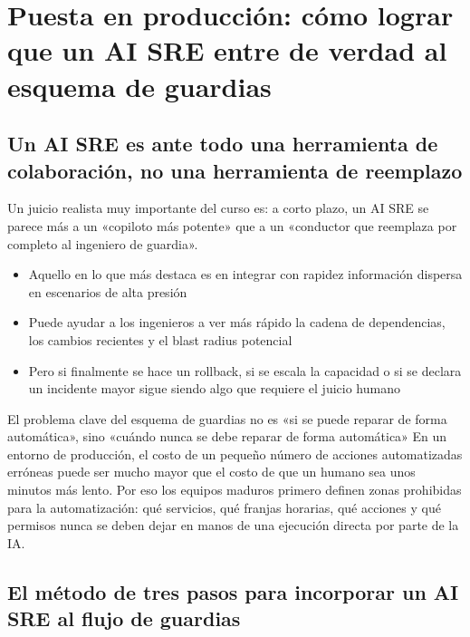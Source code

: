\section{Puesta en producción: cómo lograr que un AI SRE entre de verdad al esquema de guardias}

\subsection{Un AI SRE es ante todo una herramienta de colaboración, no una herramienta de reemplazo}

Un juicio realista muy importante del curso es: a corto plazo, un AI SRE se parece más a un «copiloto más potente» que a un «conductor que reemplaza por completo al ingeniero de guardia».

\begin{itemize}
    \item Aquello en lo que más destaca es en integrar con rapidez información dispersa en escenarios de alta presión
    \item Puede ayudar a los ingenieros a ver más rápido la cadena de dependencias, los cambios recientes y el blast radius potencial
    \item Pero si finalmente se hace un rollback, si se escala la capacidad o si se declara un incidente mayor sigue siendo algo que requiere el juicio humano
\end{itemize}

\begin{importantbox}{El problema clave del esquema de guardias no es «si se puede reparar de forma automática», sino «cuándo nunca se debe reparar de forma automática»}
En un entorno de producción, el costo de un pequeño número de acciones automatizadas erróneas puede ser mucho mayor que el costo de que un humano sea unos minutos más lento. Por eso los equipos maduros primero definen zonas prohibidas para la automatización: qué servicios, qué franjas horarias, qué acciones y qué permisos nunca se deben dejar en manos de una ejecución directa por parte de la IA.
\end{importantbox}

\subsection{El método de tres pasos para incorporar un AI SRE al flujo de guardias}


